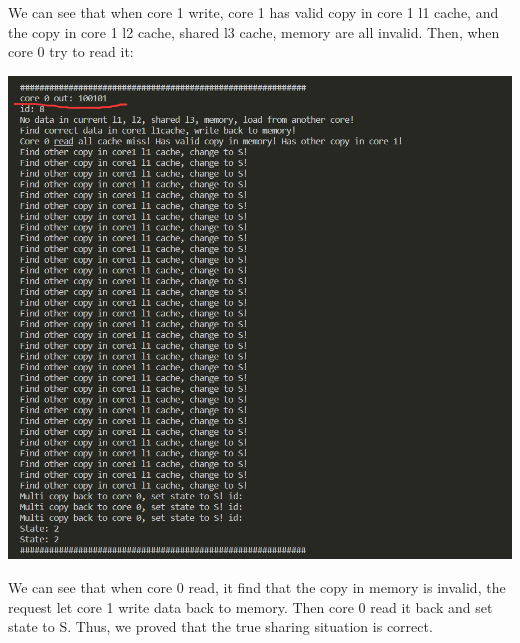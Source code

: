 \mathbb{R} \documentclass{article}
\begin{document}
We can see that when core 1 write, core 1 has valid copy in core 1 l1 cache, and the copy in core 1 l2 cache, shared l3 cache, memory are all invalid. Then, when core 0 try to read it:
\begin{center}
  \includegraphics[scale = 0.4]{12.png}
\end{center}
We can see that when core 0 read, it find that the copy in memory is invalid, the request let core 1 write data back to memory. Then core 0 read it back and set state to S. Thus, we proved that the true sharing situation is correct.
\end{document}
